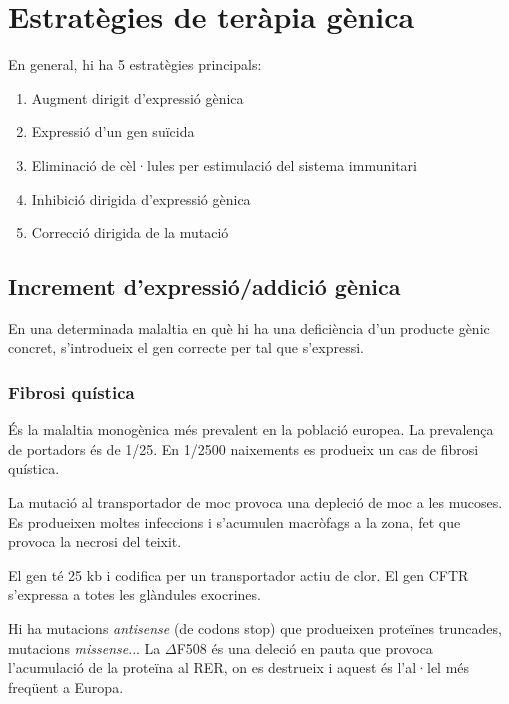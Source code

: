 \section{Estratègies de teràpia gènica}
\label{sec:estr-de-terap}

En general, hi ha 5 estratègies principals:
\begin{enumerate}
\item Augment dirigit d'expressió gènica
\item Expressió d'un gen suïcida
\item Eliminació de cèl·lules per estimulació del sistema immunitari
\item Inhibició dirigida d'expressió gènica
\item Correcció dirigida de la mutació
\end{enumerate}

\subsection{Increment d'expressió/addició gènica}
\label{sec:incr-dexpr-genica}
En una determinada malaltia en què hi ha una deficiència d'un producte
gènic concret, s'introdueix el gen correcte per tal que s'expressi.

\subsubsection{Fibrosi quística}
\label{sec:fibrosi-quistica}
És la malaltia monogènica més prevalent en la població europea. La
prevalença de portadors és de 1/25. En 1/2500 naixements es produeix
un cas de fibrosi quística.

La mutació al transportador de moc provoca una depleció de moc a les
mucoses. Es produeixen moltes infeccions i s'acumulen macròfags a la
zona, fet que provoca la necrosi del teixit.

El gen té 25 kb i codifica per un transportador actiu de clor. El gen
CFTR s'expressa a totes les glàndules exocrines.

Hi ha mutacions \textit{antisense} (de codons stop) que produeixen
proteïnes truncades, mutacions \textit{missense}... La $\Delta$F508 és
una deleció en pauta que provoca l'acumulació de la proteïna al RER,
on es destrueix i aquest és l'al·lel més freqüent a Europa.


